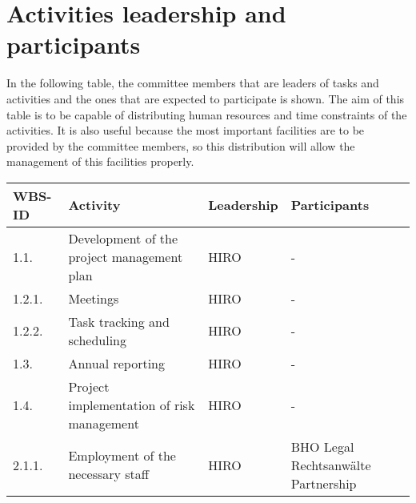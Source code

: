 \section{Activities leadership and participants}
In the following table, the committee members that are leaders of tasks and activities and the ones that are expected to participate is shown. The aim of this table is to be capable of distributing human resources and time constraints of the activities. It is also useful because the most important facilities are to be provided by the committee members, so this distribution will allow the management of this facilities properly. 

\begin{longtable}[H]{p{1.5cm} >{\raggedright\arraybackslash}p{4cm} >{\raggedright\arraybackslash}p{3.8cm} >{\raggedright\arraybackslash}p{4cm}}
	
	\toprule[2pt]
	
	\textbf{WBS-ID} &  \textbf{Activity}  & \textbf{Leadership} & \textbf{Participants} \\ 
	
	\midrule [1.5pt]
	\endhead
	
	1.1. & Development of the project management plan & HIRO& -\vspace{0.2cm} \\
	
	\midrule

	1.2.1. & Meetings & HIRO & -\vspace{0.2cm} \\
	
	\midrule
	
	1.2.2. & Task tracking and scheduling & HIRO & -\vspace{0.2cm} \\
	
	\midrule
	
	1.3. & Annual reporting & HIRO & -\vspace{0.2cm} \\
	
	\midrule
	
	1.4. & Project implementation of risk management & HIRO & -\vspace{0.2cm} \\
	
	\midrule
	
	2.1.1. & Employment of the necessary staff & HIRO & BHO Legal Rechtsanwälte Partnership\vspace{0.2cm} \\
	

\end{longtable}
